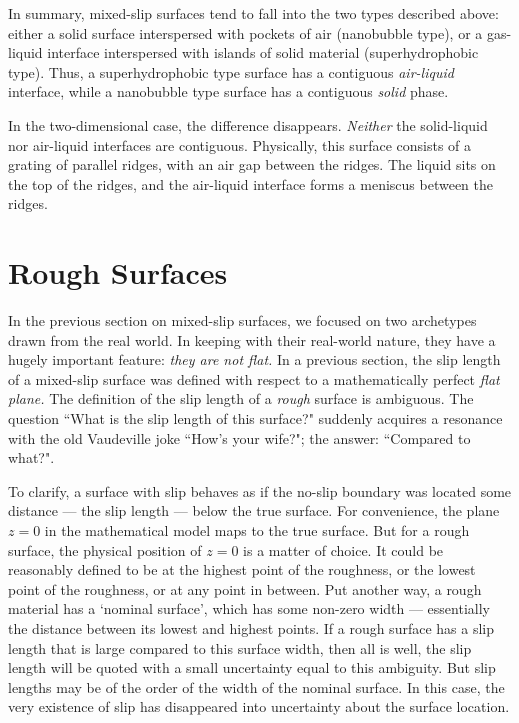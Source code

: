 \documentclass[a4paper]{report}
\begin{document}
\vspace*{1em}
In summary, mixed-slip surfaces tend to fall into the two types described above: either a solid surface interspersed with pockets of air (nanobubble type), or a gas-liquid interface interspersed with islands of solid material (superhydrophobic type).  Thus, a superhydrophobic type surface has a contiguous \emph{air-liquid} interface, while a nanobubble type surface has a contiguous \emph{solid} phase.

In the two-dimensional case, the difference disappears.  \emph{Neither} the solid-liquid nor air-liquid interfaces are contiguous.  Physically, this surface consists of a grating of parallel ridges, with an air gap between the ridges.  The liquid sits on the top of the ridges, and the air-liquid interface forms a meniscus between the ridges.


\section{Rough Surfaces}

In the previous section on mixed-slip surfaces, we focused on two archetypes drawn from the real world.  In keeping with their real-world nature, they have a hugely important feature: \emph{they are not flat.}  In a previous section, the slip length of a mixed-slip surface was defined with respect to a mathematically perfect \emph{flat plane.}  The definition of the slip length of a \emph{rough} surface is ambiguous.  The question ``What is the slip length of this surface?" suddenly acquires a resonance with the old Vaudeville joke ``How's your wife?";  the answer: ``Compared to what?".

To clarify, a surface with slip behaves as if the no-slip boundary was located some distance --- the slip length --- below the true surface.  For convenience, the plane $z=0$ in the mathematical model maps to the true surface. But for a rough surface, the physical position of $z=0$ is a matter of choice.  It could be reasonably defined to be at the highest point of the roughness, or the lowest point of the roughness, or at any point in between.  Put another way, a rough material has a  `nominal surface', which has some non-zero width --- essentially the distance between its lowest and highest points.  If a rough surface has a slip length that is  large compared to this surface width, then all is well, the slip length will be quoted with a small uncertainty equal to this ambiguity.  But slip lengths may be of the order of the width of the nominal surface.  In this case, the very existence of slip has disappeared into uncertainty about the surface location.
\end{document}
